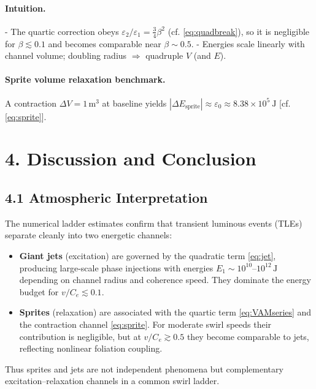 \documentclass[11pt]{article}
\newcommand{\Ce}{C_{e}}
\begin{document}
\paragraph{Intuition.}
    - The quartic correction obeys $\varepsilon_2/\varepsilon_1=\tfrac{3}{4}\beta^2$ (cf. \eqref{eq:quadbreak}), so it is negligible for $\beta\lesssim 0.1$ and becomes comparable near $\beta\sim 0.5$.
    - Energies scale linearly with channel volume; doubling radius $\Rightarrow$ quadruple $V$ (and $E$).

\paragraph{Sprite volume relaxation benchmark.}
    A contraction $\Delta V=1\,\mathrm{m^3}$ at baseline yields $|\Delta E_{\text{sprite}}| \approx \varepsilon_0 \approx 8.38\times 10^{5}\ \mathrm{J}$ [cf. \eqref{eq:sprite}].


\section*{4. Discussion and Conclusion}

\subsection*{4.1 Atmospheric Interpretation}

    The numerical ladder estimates confirm that transient luminous events
    (TLEs) separate cleanly into two energetic channels:

    \begin{itemize}
    \item \textbf{Giant jets} (excitation) are governed by the quadratic term
    \eqref{eq:jet}, producing large-scale phase injections with energies
    $E_1 \sim 10^{10}$--$10^{12}\,\mathrm{J}$ depending on channel radius
    and coherence speed. They dominate the energy budget for
    $v/\Ce \lesssim 0.1$.
    \item \textbf{Sprites} (relaxation) are associated with the quartic term
    \eqref{eq:VAMseries} and the contraction channel \eqref{eq:sprite}.
    For moderate swirl speeds their contribution is negligible, but at
    $v/\Ce \gtrsim 0.5$ they become comparable to jets, reflecting
    nonlinear foliation coupling.
    \end{itemize}

    Thus sprites and jets are not independent phenomena but
    complementary excitation--relaxation channels in a common swirl
    ladder.
\end{document}
